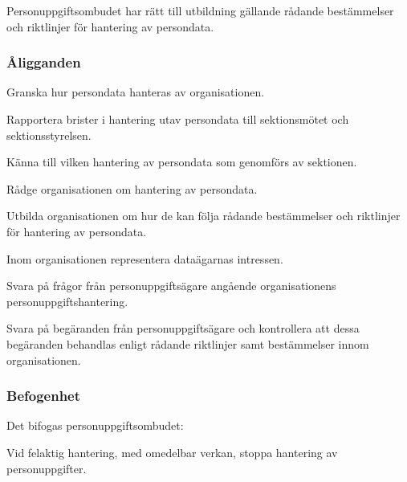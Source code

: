 Personuppgiftsombudet har rätt till utbildning gällande rådande bestämmelser och
riktlinjer för hantering av persondata.

\subsubsection{Åligganden}
\begin{att}
    \item  Granska hur persondata hanteras av organisationen.
    \item  Rapportera brister i hantering utav persondata till sektionsmötet och sektionsstyrelsen.
    \item  Känna till vilken hantering av persondata som genomförs av sektionen.
    \item  Rådge organisationen om hantering av persondata.
    \item  Utbilda organisationen om hur de kan följa rådande bestämmelser och riktlinjer
för hantering av persondata.
    \item  Inom organisationen representera dataägarnas intressen.
    \item  Svara på frågor från personuppgiftsägare angående organisationens personuppgiftshantering.
    \item  Svara på begäranden från personuppgiftsägare och kontrollera att dessa begäranden
behandlas enligt rådande riktlinjer samt bestämmelser innom organisationen.
\end{att}

\subsubsection{Befogenhet}
Det bifogas personuppgiftsombudet:
\begin{att}
    \item  Vid felaktig hantering, med omedelbar verkan, stoppa hantering av personuppgifter.
\end{att}